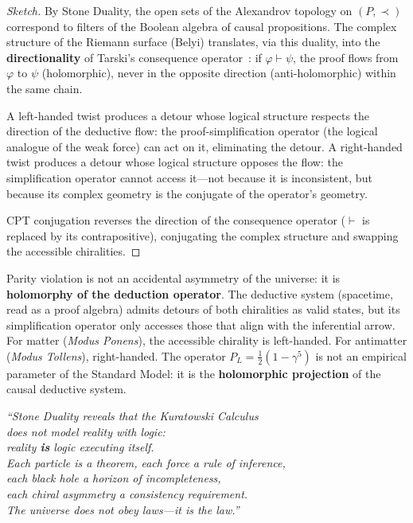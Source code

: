 \begin{proof}[Sketch]
By Stone Duality, the open sets of the Alexandrov topology
on $(P, \prec)$ correspond to filters of the Boolean
algebra of causal propositions. The complex structure of the
Riemann surface (Belyi) translates, via this duality,
into the \textbf{directionality} of Tarski's consequence
operator~\cite{tarski1930}: if $\varphi \vdash \psi$, the
proof flows from $\varphi$ to $\psi$ (holomorphic), never in
the opposite direction (anti-holomorphic) within the same chain.

A left-handed twist produces a detour whose logical structure
respects the direction of the deductive flow: the
proof-simplification operator (the logical analogue of the weak force)
can act on it, eliminating the detour. A right-handed twist
produces a detour whose logical structure opposes the flow:
the simplification operator cannot access it---not because
it is inconsistent, but because its complex geometry is the conjugate
of the operator's geometry.

CPT conjugation reverses the direction of the consequence
operator ($\vdash$ is replaced by its contrapositive), conjugating
the complex structure and swapping the accessible chiralities.
\end{proof}

\begin{result}[title={Parity Violation Is Holomorphic Consistency}]
\label{res:stone-parity}
Parity violation is not an accidental asymmetry of the
universe: it is \textbf{holomorphy of the deduction operator}. The
deductive system (spacetime, read as a proof algebra)
admits detours of both chiralities as valid states, but its
simplification operator only accesses those that align with the
inferential arrow. For matter (\emph{Modus Ponens}), the
accessible chirality is left-handed. For antimatter (\emph{Modus
Tollens}), right-handed. The operator $P_L = \tfrac{1}{2}(1-\gamma^5)$
is not an empirical parameter of the Standard Model: it is the
\textbf{holomorphic projection} of the causal deductive system.
\end{result}

\bigskip
\begin{center}
\large\itshape\color{structure}
``Stone Duality reveals that the Kuratowski Calculus\\
does not \emph{model} reality with logic:\\
reality \textbf{is} logic executing itself.\\
Each particle is a theorem, each force a rule of inference,\\
each black hole a horizon of incompleteness,\\
each chiral asymmetry a consistency requirement.\\
The universe does not obey laws---it \emph{is} the law.''
\end{center}

\backmatter
{}



